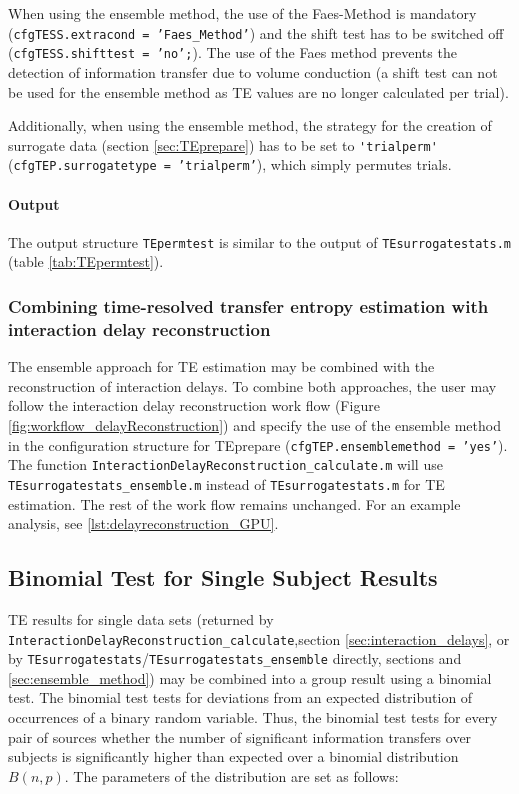 \documentclass[a4paper,10pt]{article}
\begin{document}
When using the ensemble method, the use of the Faes-Method is mandatory (\texttt{cfgTESS.extracond = 'Faes\_Method'}) and the shift test has to be switched off (\texttt{cfgTESS.shifttest = 'no';}). The use of the Faes method prevents the detection of information transfer due to volume conduction (a shift test can not be used for the ensemble method as TE values are no longer calculated per trial).
 
Additionally, when using the ensemble method, the strategy for the creation of surrogate data (section \ref{sec:TEprepare}) has to be set to \verb+'trialperm'+ (\texttt{cfgTEP.surrogatetype = 'trialperm'}), which simply permutes trials.

\paragraph*{Output} The output structure \texttt{TEpermtest} is similar to the output of \verb&TEsurrogatestats.m& (table \ref{tab:TEpermtest}).

\subsubsection{Combining time-resolved transfer entropy estimation with interaction delay reconstruction} 

The ensemble approach for TE estimation may be combined with the reconstruction of interaction delays. To combine both approaches, the user may follow the interaction delay reconstruction work flow (Figure \ref{fig:workflow_delayReconstruction}) and specify the use of the ensemble method in the configuration structure for TEprepare (\texttt{cfgTEP.ensemblemethod = 'yes'}). The function \texttt{InteractionDelayReconstruction\_calculate.m} will use \texttt{TEsurrogatestats\_ensemble.m} instead of \texttt{TEsurrogatestats.m} for TE estimation. The rest of the work flow remains unchanged. For an example analysis, see \ref{lst:delayreconstruction_GPU}.



\subsection{Binomial Test for Single Subject Results} \label{sec:binomstats}

TE results for single data sets (returned by \texttt{InteractionDelayReconstruction\_calculate},section \ref{sec:interaction_delays}, or by \texttt{TEsurrogatestats}/\texttt{TEsurrogatestats\_ensemble} directly, sections \label{sec:TEsurrogatestats} and \ref{sec:ensemble_method}) may be combined into a group result using a binomial test. The binomial test tests for deviations from an expected distribution of occurrences of a binary random variable. Thus, the binomial test tests for every pair of sources whether the number of significant information transfers over subjects is significantly higher than expected over a binomial distribution $B(n,p)$. The parameters of the distribution are set as follows:
\end{document}
